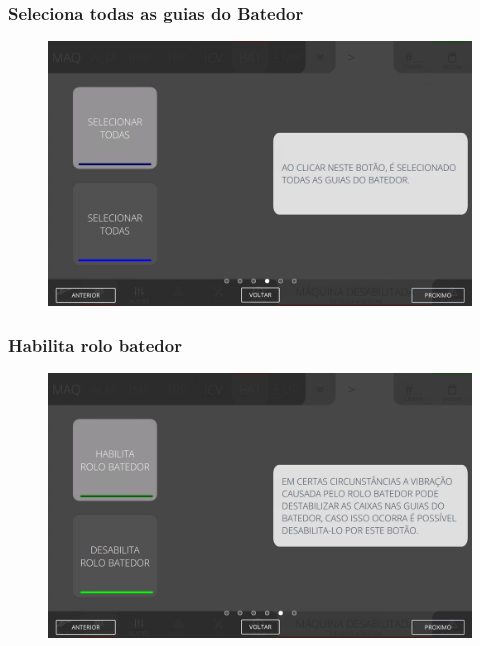 \newpage
\thispagestyle{fancy}
\vspace*{40 pt}
\subsubsection{\small{Seleciona todas as guias do Batedor}} \label{sec:comandosBatedorSelecionaTodasAsGuiasDoBatedor}
\vspace*{\fill}
\begin{figure}[h]
    \centering
    \includegraphics[width=576 px,height=360 px]{src/imagesICV/07-scout/commands/4.png}
\end{figure}
\vspace*{\fill}

\newpage
\thispagestyle{fancy}
\vspace*{40 pt}
\subsubsection{\small{Habilita rolo batedor}} \label{sec:comandosBatedorHabilitaRoloBatedor}
\vspace*{\fill}
\begin{figure}[h]
    \centering
    \includegraphics[width=576 px,height=360 px]{src/imagesICV/07-scout/commands/5.png}
\end{figure}
\vspace*{\fill}

